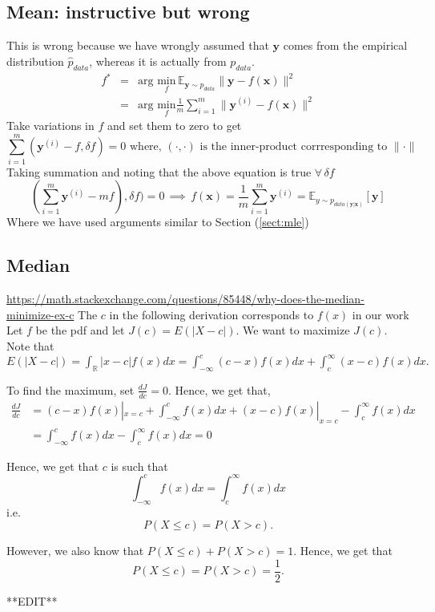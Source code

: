 \documentclass{article}
\newcommand{\beq}{\begin{equation}}
\newcommand{\eeq}{\end{equation}}
\newcommand{\ber}{\begin{eqnarray}}
\newcommand{\eer}{\end{eqnarray}}
\begin{document}
\subsection{Mean: instructive but wrong}
This is wrong because we have wrongly assumed that $\pmb{y}$ comes from the empirical distribution $\hat{p}_{data}$, whereas it is actually from $p_{data}$.
\ber
f^{*} &=& \text{arg } \underset{f}{\text{min}}\, {\mathbb{E}}_{\pmb{y}\sim{p_{data}}}\|{\pmb{y}}-f(\pmb{x})\|^2 \\
     &=& \text{arg } \underset{f}{\text{min}} \frac{1}{m}\sum_{i=1}^{m}\|{\pmb{y}^{(i)}}-f(\pmb{x})\|^2
\eer
Take variations in $f$ and set them to zero to get
\beq
\sum_{i=1}^{m}(\pmb{y}^{(i)}-f,\delta{f}) = 0 \text{ where, } (\cdot,\cdot) \text{ is the inner-product corrresponding to }\|\cdot\|
\eeq
Taking summation and noting that the above equation is true $\forall\,\delta{f}$
\beq
(\sum_{i=1}^{m}\pmb{y}^{(i)}-mf),\delta{f}) = 0 \, \implies\,f(\pmb{x})=\frac{1}{m}\sum_{i=1}^{m}\pmb{y}^{(i)} = \mathbb{E}_{y\sim{p_{data(\pmb{y}|\pmb{x})}}}[\pmb{y}]
\eeq
Where we have used arguments similar to Section (\ref{sect:mle})
\subsection{Median}
\url{https://math.stackexchange.com/questions/85448/why-does-the-median-minimize-ex-c} The $c$ in the following derivation corresponds to $f(x)$ in our work\\


Let $f$ be the pdf and let $J(c) = E(|X-c|)$. We want to maximize $J(c)$. Note that $E(|X-c|) = \int_{\mathbb{R}} |x-c| f(x) dx = \int_{-\infty}^{c} (c-x) f(x) dx  + \int_c^{\infty} (x-c) f(x) dx.$

To find the maximum, set $\frac{dJ}{dc} = 0$. Hence, we get that,
\begin{align}
\frac{dJ}{dc} & = (c-x)f(x) | _{x=c} + \int_{-\infty}^{c} f(x) dx + (x-c)f(x) | _{x=c} - \int_c^{\infty} f(x) dx\\
& = \int_{-\infty}^{c} f(x) dx - \int_c^{\infty} f(x) dx = 0
\end{align}


Hence, we get that $c$ is such that $$\int_{-\infty}^{c} f(x) dx = \int_c^{\infty} f(x) dx$$ i.e. $$P(X \leq c) = P(X > c).$$

However, we also know that $P(X \leq c) + P(X > c) = 1$. Hence, we get that $$P(X \leq c) = P(X > c) = \frac12.$$

**EDIT**
\end{document}
